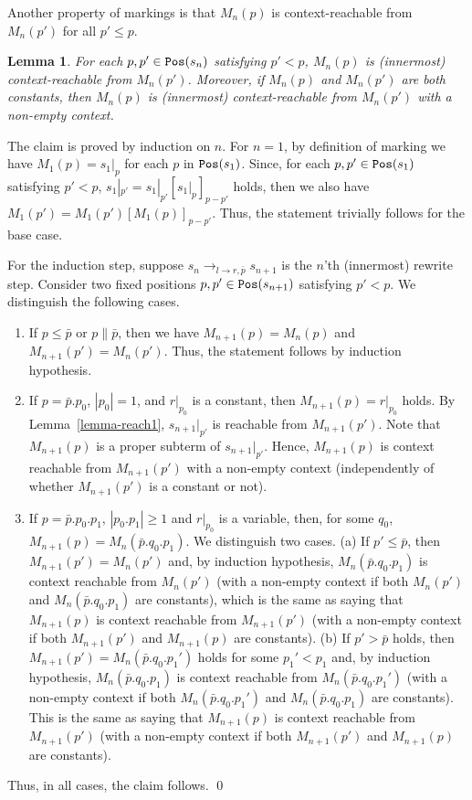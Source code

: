 \documentclass{LMCS}
\theoremstyle{plain}
\newtheorem{lemma}[thm]{Lemma}
\newcommand\Pos{{\tt Pos}}
\begin{document}
Another property of markings is that 
$M_n(p)$ is context-reachable from $M_n(p')$ 
for all $p' \leq p$.
\begin{lemma}\label{lemma-creach1}
For each $p,p'\in\Pos(s_n)$ satisfying $p' < p$,
$M_n(p)$ is (innermost) context-reachable from $M_n(p')$.
Moreover, if 
$M_n(p)$ and $M_n(p')$ are both constants,
then $M_n(p)$ is (innermost) context-reachable from $M_n(p')$
with a non-empty context.
\end{lemma}
\proof
The claim is proved by induction on $n$.
For $n=1$, by definition of marking we have $M_1(p)=s_1|_p$ for
each $p$ in ${\tt Pos}(s_1)$. Since, for each
$p,p'\in\Pos(s_1)$ satisfying $p' < p$, 
$s_1|_{p'}=s_1|_{p'}[s_1|_p]_{p-p'}$ holds, then we also have
$M_1(p')=M_1(p')[M_1(p)]_{p-p'}$. Thus, the statement
trivially follows for the base case.

For the induction step,
suppose $s_n \rightarrow_{l\rightarrow r,\bar{p}} s_{n+1}$ is
the $n$'th (innermost) rewrite step. Consider two fixed positions
$p,p'\in\Pos(s_{n+1})$ satisfying $p' < p$.
We distinguish the following cases.
\begin{enumerate}[$\bullet$]
\item If $p\leq \bar{p}$ or $p\parallel \bar{p}$, then we have
$M_{n+1}(p) = M_n(p)$ and $M_{n+1}(p') = M_n(p')$.
Thus, the statement follows by induction hypothesis.

\item If $p = \bar{p}.p_0$, $|p_0|=1$, and $r|_{p_0}$ is a constant, then
$M_{n+1}(p) = r|_{p_0}$ holds.
By Lemma~\ref{lemma-reach1},
$s_{n+1}|_{p'}$ is reachable from $M_{n+1}(p')$.
Note that $M_{n+1}(p)$ is a proper subterm of $s_{n+1}|_{p'}$.
Hence,
$M_{n+1}(p)$ is context reachable from $M_{n+1}(p')$
with a non-empty context (independently of whether
$M_{n+1}(p')$ is a constant or not).

\item If $p = \bar{p}.p_0.p_1$, $|p_0.p_1|\geq 1$ and $r|_{p_0}$ is a variable,
then, for some $q_0$, $M_{n+1}(p) = M_{n}(\bar{p}.q_0.p_1)$.
We distinguish two cases. 
(a) If $p' \leq \bar{p}$, then 
 $M_{n+1}(p') = M_{n}(p')$ and, by induction hypothesis,
$M_n(\bar{p}.q_0.p_1)$ is context reachable from $M_n(p')$
(with a non-empty context if both $M_n(p')$ and
$M_n(\bar{p}.q_0.p_1)$ are constants),
which is the same as saying that
$M_{n+1}(p)$ is context reachable from $M_{n+1}(p')$
(with a non-empty context if both $M_{n+1}(p')$ and
$M_{n+1}(p)$ are constants).
(b) If $p' > \bar{p}$ holds, then
$M_{n+1}(p') = M_n(\bar{p}.q_0.p_1')$ holds for some $p_1' < p_1$
and, by induction hypothesis,
$M_n(\bar{p}.q_0.p_1)$ is context reachable from
$M_n(\bar{p}.q_0.p_1')$
(with a non-empty context if both $M_n(\bar{p}.q_0.p_1')$ and
$M_n(\bar{p}.q_0.p_1)$ are constants).
This is the same as saying that
$M_{n+1}(p)$ is context reachable from $M_{n+1}(p')$
(with a non-empty context if both $M_{n+1}(p')$ and
$M_{n+1}(p)$ are constants).
\end{enumerate}
Thus, in all cases, the claim follows. \qed
\end{document}
